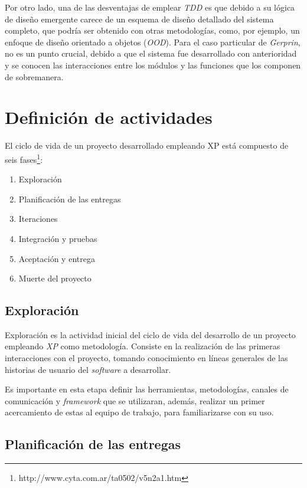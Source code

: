 Por otro lado, una de las desventajas de emplear \emph{TDD} es que debido a su lógica de diseño emergente carece de un esquema de diseño detallado del sistema completo, que podría ser obtenido con otras metodologías, como, por ejemplo, un enfoque de diseño orientado a objetos (\emph{OOD}).  Para el caso particular de \emph{Gerprin}, no es un punto crucial, debido a que el sistema fue desarrollado con anterioridad y se conocen las interacciones entre los módulos y las funciones que los componen de sobremanera.

\section{Definición de actividades}

El ciclo de vida de un proyecto desarrollado empleando XP está compuesto de seis fases\footnote{http://www.cyta.com.ar/ta0502/v5n2a1.htm}:  

\begin{enumerate}
	\item Exploración
	\item Planificación de las entregas
	\item Iteraciones
	\item Integración y pruebas
	\item Aceptación y entrega
	\item Muerte del proyecto
\end{enumerate}

\subsection{Exploración}

Exploración es la actividad inicial del ciclo de vida del desarrollo de un proyecto empleando \emph{XP} como metodología. Consiste en la realización de las primeras interacciones con el proyecto, tomando conocimiento en líneas generales de las historias de usuario del \emph{software} a desarrollar. 

Es importante en esta etapa definir las herramientas, metodologías, canales de comunicación y \emph{framework} que se utilizaran, además, realizar un primer acercamiento de estas al equipo de trabajo, para familiarizarse con su uso.

\subsection{Planificación de las entregas}

